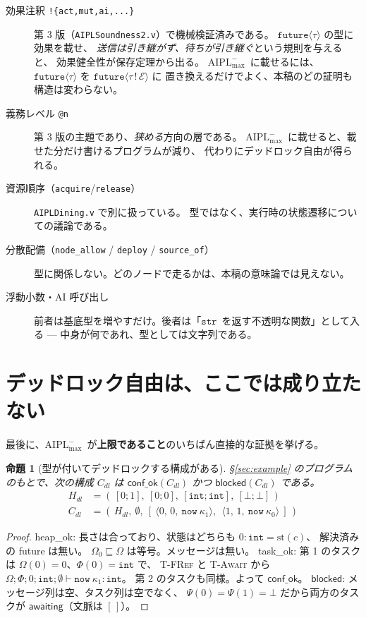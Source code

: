\documentclass[11pt,a4paper]{ltjsarticle}
\newtheorem{proposition}[theorem]{命題}
\theoremstyle{definition}
\theoremstyle{remark}
\newcommand{\tint}{\ensuremath{\mathtt{int}}}
\newcommand{\tstr}{\ensuremath{\mathtt{str}}}
\newcommand{\tfut}[1]{\ensuremath{\mathtt{future}\langle #1 \rangle}}
\newcommand{\Om}{\Omega}
\newcommand{\Ph}{\Phi}
\newcommand{\Ps}{\Psi}
\newcommand{\styp}{\mathrm{st}}
\newcommand{\heapok}{\textsf{heap\_ok}}
\newcommand{\taskok}{\textsf{task\_ok}}
\newcommand{\confok}{\textsf{conf\_ok}}
\newcommand{\blocked}{\textsf{blocked}}
\newcommand{\awaiting}{\textsf{awaiting}}
\newcommand{\Amax}{\ensuremath{\mathrm{AIPL}^{-}_{\max}}}
\begin{document}
\begin{description}
\item[効果注釈 \texttt{!\{act,mut,ai,...\}}]
  第 3 版（\texttt{AIPLSoundness2.v}）で機械検証済みである。
  \tfut{\tau} の型に効果を載せ、
  \emph{送信は引き継がず、待ちが引き継ぐ}という規則を与えると、
  効果健全性が保存定理から出る。
  \Amax\ に載せるには、\tfut{\tau} を $\mathtt{future}\langle\tau\,!\,\mathcal{E}\rangle$ に
  置き換えるだけでよく、本稿のどの証明も構造は変わらない。
\item[義務レベル \texttt{@n}]
  第 3 版の主題であり、\emph{狭める}方向の層である。
  \Amax\ に載せると、載せた分だけ書けるプログラムが減り、
  代わりにデッドロック自由が得られる。
\item[資源順序（\texttt{acquire}/\texttt{release}）]
  \texttt{AIPLDining.v} で別に扱っている。
  型ではなく、実行時の状態遷移についての議論である。
\item[分散配備（\texttt{node\_allow} / \texttt{deploy} / \texttt{source\_of}）]
  型に関係しない。どのノードで走るかは、本稿の意味論では見えない。
\item[浮動小数・AI 呼び出し]
  前者は基底型を増やすだけ。後者は「\tstr\ を返す不透明な関数」として入る
  --- 中身が何であれ、型としては文字列である。
\end{description}

\section{デッドロック自由は、ここでは成り立たない}\label{sec:dl}

最後に、\Amax\ が\textbf{上限であること}のいちばん直接的な証拠を挙げる。

\begin{proposition}[型が付いてデッドロックする構成がある]\label{prop:dl}
\S\ref{sec:example} のプログラムのもとで、次の構成 $C_{dl}$ は
$\confok(C_{dl})$ かつ $\blocked(C_{dl})$ である。
\[
\begin{aligned}
H_{dl} &= (\,[0;1],\ [0;0],\ [\tint;\tint],\ [\bot;\bot]\,) \\
C_{dl} &= (\,H_{dl},\ \emptyset,\
  [\ \langle 0,\,0,\ \mathtt{now}\ \kappa_1 \rangle,\ \
      \langle 1,\,1,\ \mathtt{now}\ \kappa_0 \rangle\ ]\,)
\end{aligned}
\]
\end{proposition}

\begin{proof}
\heapok: 長さは合っており、状態はどちらも $0 : \tint = \styp(c)$、
解決済みの future は無い。
$\Om_0 \sqsubseteq \Om$ は等号。メッセージは無い。
\taskok: 第 1 のタスクは $\Om(0) = 0$、$\Ph(0) = \tint$ で、
\textsc{T-FRef} と \textsc{T-Await} から
$\Om;\Ph;0;\tint;\emptyset \vdash \mathtt{now}\ \kappa_1 : \tint$。
第 2 のタスクも同様。よって $\confok$。
$\blocked$: メッセージ列は空、タスク列は空でなく、
$\Ps(0) = \Ps(1) = \bot$ だから両方のタスクが $\awaiting$（文脈は $[\,]$）。
\end{proof}
\end{document}
